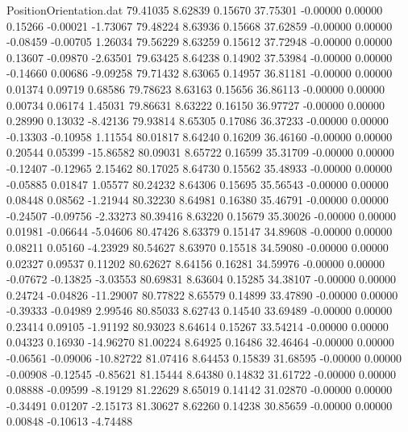 \begin{filecontents}{PositionOrientation.dat}
  79.41035    8.62839    0.15670    37.75301   -0.00000    0.00000    0.15266   -0.00021   -1.73067
  79.48224    8.63936    0.15668    37.62859   -0.00000    0.00000   -0.08459   -0.00705    1.26034
  79.56229    8.63259    0.15612    37.72948   -0.00000    0.00000    0.13607   -0.09870   -2.63501
  79.63425    8.64238    0.14902    37.53984   -0.00000    0.00000   -0.14660    0.00686   -9.09258
  79.71432    8.63065    0.14957    36.81181   -0.00000    0.00000    0.01374    0.09719    0.68586
  79.78623    8.63163    0.15656    36.86113   -0.00000    0.00000    0.00734    0.06174    1.45031
  79.86631    8.63222    0.16150    36.97727   -0.00000    0.00000    0.28990    0.13032   -8.42136
  79.93814    8.65305    0.17086    36.37233   -0.00000    0.00000   -0.13303   -0.10958    1.11554
  80.01817    8.64240    0.16209    36.46160   -0.00000    0.00000    0.20544    0.05399  -15.86582
  80.09031    8.65722    0.16599    35.31709   -0.00000    0.00000   -0.12407   -0.12965    2.15462
  80.17025    8.64730    0.15562    35.48933   -0.00000    0.00000   -0.05885    0.01847    1.05577
  80.24232    8.64306    0.15695    35.56543   -0.00000    0.00000    0.08448    0.08562   -1.21944
  80.32230    8.64981    0.16380    35.46791   -0.00000    0.00000   -0.24507   -0.09756   -2.33273
  80.39416    8.63220    0.15679    35.30026   -0.00000    0.00000    0.01981   -0.06644   -5.04606
  80.47426    8.63379    0.15147    34.89608   -0.00000    0.00000    0.08211    0.05160   -4.23929
  80.54627    8.63970    0.15518    34.59080   -0.00000    0.00000    0.02327    0.09537    0.11202
  80.62627    8.64156    0.16281    34.59976   -0.00000    0.00000   -0.07672   -0.13825   -3.03553
  80.69831    8.63604    0.15285    34.38107   -0.00000    0.00000    0.24724   -0.04826  -11.29007
  80.77822    8.65579    0.14899    33.47890   -0.00000    0.00000   -0.39333   -0.04989    2.99546
  80.85033    8.62743    0.14540    33.69489   -0.00000    0.00000    0.23414    0.09105   -1.91192
  80.93023    8.64614    0.15267    33.54214   -0.00000    0.00000    0.04323    0.16930  -14.96270
  81.00224    8.64925    0.16486    32.46464   -0.00000    0.00000   -0.06561   -0.09006  -10.82722
  81.07416    8.64453    0.15839    31.68595   -0.00000    0.00000   -0.00908   -0.12545   -0.85621
  81.15444    8.64380    0.14832    31.61722   -0.00000    0.00000    0.08888   -0.09599   -8.19129
  81.22629    8.65019    0.14142    31.02870   -0.00000    0.00000   -0.34491    0.01207   -2.15173
  81.30627    8.62260    0.14238    30.85659   -0.00000    0.00000    0.00848   -0.10613   -4.74488

\end{filecontents}
